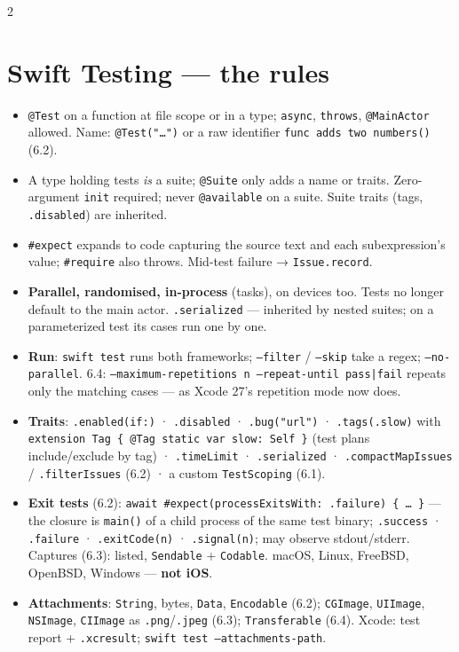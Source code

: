 \documentclass[8pt]{extarticle}
\newcommand\ct[1]{\texttt{#1}}
\begin{document}
\begin{multicols}{2}
\section{Swift Testing — the rules}
\begin{itemize}
  \item \ct{@Test} on a function at file scope or in a type; \ct{async}, \ct{throws},
        \ct{@MainActor} allowed. Name: \ct{@Test("…")} or a raw identifier
        \ct{func \textasciigrave adds two numbers\textasciigrave()} (6.2).
  \item A type holding tests \emph{is} a suite; \ct{@Suite} only adds a name or traits.
        Zero-argument \ct{init} required; never \ct{@available} on a suite. Suite traits
        (tags, \ct{.disabled}) are inherited.
  \item \ct{\#expect} expands to code capturing the source text and each subexpression's
        value; \ct{\#require} also throws. Mid-test failure → \ct{Issue.record}.
  \item \textbf{Parallel, randomised, in-process} (tasks), on devices too. Tests no longer
        default to the main actor. \ct{.serialized} — inherited by nested suites; on a
        parameterized test its cases run one by one.
  \item \textbf{Run}: \ct{swift test} runs both frameworks; \ct{--filter} / \ct{--skip} take a
        regex; \ct{--no-parallel}. 6.4: \ct{--maximum-repetitions n --repeat-until pass|fail}
        repeats only the matching cases — as Xcode 27's repetition mode now does.
  \item \textbf{Traits}: \ct{.enabled(if:)} · \ct{.disabled} · \ct{.bug("url")} ·
        \ct{.tags(.slow)} with \ct{extension Tag \{ @Tag static var slow: Self \}} (test
        plans include/exclude by tag) · \ct{.timeLimit} · \ct{.serialized} ·
        \ct{.compactMapIssues} / \ct{.filterIssues} (6.2) · a custom \ct{TestScoping} (6.1).
  \item \textbf{Exit tests} (6.2): \ct{await \#expect(processExitsWith: .failure) \{ … \}} —
        the closure is \ct{main()} of a child process of the same test binary;
        \ct{.success} · \ct{.failure} · \ct{.exitCode(n)} · \ct{.signal(n)}; may observe
        stdout/stderr. Captures (6.3): listed, \ct{Sendable} + \ct{Codable}. macOS, Linux,
        FreeBSD, OpenBSD, Windows — \textbf{not iOS}.
  \item \textbf{Attachments}: \ct{String}, bytes, \ct{Data}, \ct{Encodable} (6.2); \ct{CGImage},
        \ct{UIImage}, \ct{NSImage}, \ct{CIImage} as \ct{.png}/\ct{.jpeg} (6.3); \ct{Transferable}
        (6.4). Xcode: test report + \ct{.xcresult}; \ct{swift test --attachments-path}.
\end{itemize}


\end{multicols}
\end{document}
